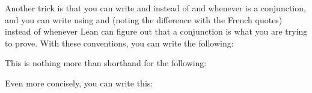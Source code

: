 \documentclass[letterpaper,10pt,english]{sphinxmanual}
\begin{document}
\sphinxAtStartPar
Another trick is that you can write  and  instead of
 and  whenever  is a conjunction,
and you can write 
using \sphinxcode{\sphinxupquote{\textbackslash{}<}} and \sphinxcode{\sphinxupquote{\textbackslash{}>}} (noting the difference with the French quotes)
instead of 
whenever Lean can figure out that a conjunction is what you are trying to prove.
With these conventions, you can write the following:

\begin{sphinxVerbatim}[commandchars=\\\{\}]
             
      
      
\end{sphinxVerbatim}

\sphinxAtStartPar
This is nothing more than shorthand for the following:

\begin{sphinxVerbatim}[commandchars=\\\{\}]
             
      
         
\end{sphinxVerbatim}

\sphinxAtStartPar
Even more concisely, you can write this:

\begin{sphinxVerbatim}[commandchars=\\\{\}]
             
    
\end{sphinxVerbatim}
\end{document}
